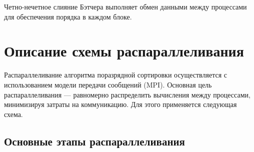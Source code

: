 \documentclass[12pt]{article}
\begin{document}
Четно-нечетное слияние Бэтчера выполняет обмен данными между процессами для обеспечения порядка в каждом блоке.

\newpage
\section*{Описание схемы распараллеливания}

Распараллеливание алгоритма поразрядной сортировки осуществляется с использованием модели передачи сообщений (MPI). Основная цель распараллеливания — равномерно распределить вычисления между процессами, минимизируя затраты на коммуникацию. Для этого применяется следующая схема.

\subsection*{Основные этапы распараллеливания}
\end{document}
